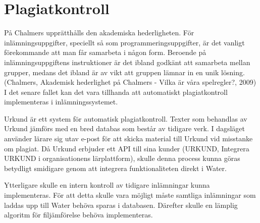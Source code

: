 \section{Plagiatkontroll}
På Chalmers upprätthålls den akademiska hederligheten. För inlämningsuppgifter, speciellt så som programmeringsuppgifter, är det vanligt förekommande att man får samarbeta i någon form. Beroende på inlämningsuppgiftens instruktioner är det ibland godkänt att samarbeta mellan grupper, medans det ibland är av vikt att gruppen lämnar in en unik lösning. (Chalmers, Akademisk hederlighet på Chalmers - Vilka är våra spelregler?, 2009) I det senare fallet kan det vara tillhanda att automatiskt plagiatkontroll implementeras i inlämningssystemet.

Urkund är ett system för automatisk plagiatkontroll. Texter som behandlas av Urkund jämförs med en bred databas som består av tidigare verk. I dagsläget använder lärare sig utav e-post för att skicka material till Urkund vid misstanke om plagiat. Då Urkund erbjuder ett API till sina kunder (URKUND, Integrera URKUND i organisationens lärplattform), skulle denna process kunna göras betydligt smidigare genom att integrera funktionaliteten direkt i Water.

Ytterligare skulle en intern kontroll av tidigare inlämningar kunna implementeras. För att detta skulle vara möjligt måste samtliga inlämningar som laddas upp till Water behöva sparas i databasen. Därefter skulle en lämplig algoritm för filjämförelse behöva implementeras.
